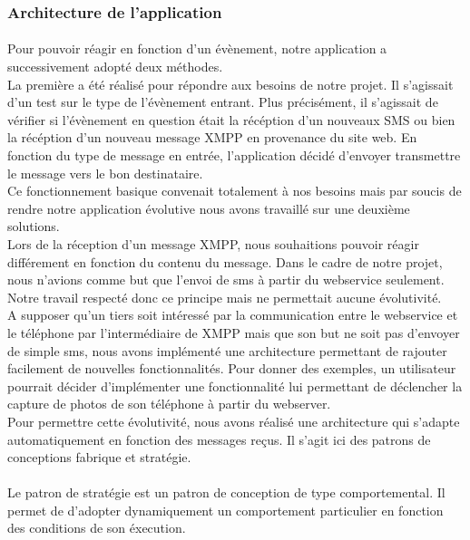 \subsubsection{Architecture de l'application}

\paragraph{}
Pour pouvoir réagir en fonction d'un évènement, notre application a successivement adopté deux méthodes.
\\
La première a été réalisé pour répondre aux besoins de notre projet. Il s'agissait d'un test sur le 
type de l'évènement entrant. Plus précisément, il s'agissait de vérifier si l'évènement en question 
était la récéption d'un nouveaux SMS ou bien la récéption d'un nouveau message XMPP en provenance du 
site web. En fonction du type de message en entrée, l'application décidé d'envoyer transmettre le message
vers le bon destinataire. 
\\
Ce fonctionnement basique convenait totalement à nos besoins mais par soucis de rendre notre application
évolutive nous avons travaillé sur une deuxième solutions.
\\
Lors de la réception d'un message XMPP, nous souhaitions pouvoir réagir différement en fonction du contenu
du message. Dans le cadre de notre projet, nous n'avions comme but que l'envoi de sms à partir du webservice
seulement. Notre travail respecté donc ce principe mais ne permettait aucune évolutivité.
\\
A supposer qu'un tiers soit intéressé par la communication entre le webservice et le téléphone par 
l'intermédiaire de XMPP mais que son but ne soit pas d'envoyer de simple sms, nous avons implémenté une
architecture permettant de rajouter facilement de nouvelles fonctionnalités. Pour donner des exemples, 
un utilisateur pourrait décider d'implémenter une fonctionnalité lui permettant de déclencher la capture
de photos de son téléphone à partir du webserver.
\\
Pour permettre cette évolutivité, nous avons réalisé une architecture qui s'adapte automatiquement en
fonction des messages reçus. Il s'agit ici des patrons de conceptions fabrique et stratégie. 

\paragraph{}
Le patron de stratégie est un patron de conception de type comportemental. Il permet de d'adopter 
dynamiquement un comportement particulier en fonction des conditions de son éxecution.

